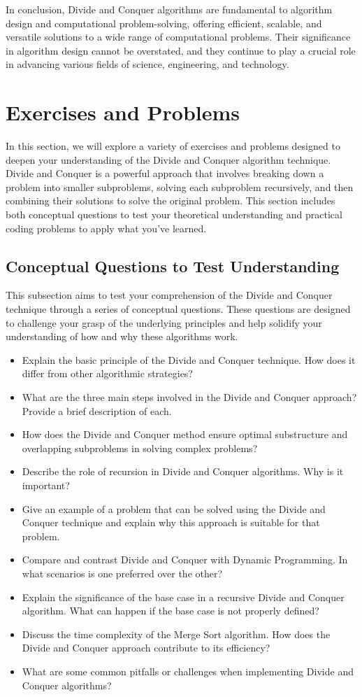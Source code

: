 \documentclass[12pt]{book} %
\begin{document}
In conclusion, Divide and Conquer algorithms are fundamental to algorithm design and computational problem-solving, offering efficient, scalable, and versatile solutions to a wide range of computational problems. Their significance in algorithm design cannot be overstated, and they continue to play a crucial role in advancing various fields of science, engineering, and technology.


\section{Exercises and Problems}
In this section, we will explore a variety of exercises and problems designed to deepen your understanding of the Divide and Conquer algorithm technique. Divide and Conquer is a powerful approach that involves breaking down a problem into smaller subproblems, solving each subproblem recursively, and then combining their solutions to solve the original problem. This section includes both conceptual questions to test your theoretical understanding and practical coding problems to apply what you've learned.

\subsection{Conceptual Questions to Test Understanding}
This subsection aims to test your comprehension of the Divide and Conquer technique through a series of conceptual questions. These questions are designed to challenge your grasp of the underlying principles and help solidify your understanding of how and why these algorithms work.

\begin{itemize}
    \item Explain the basic principle of the Divide and Conquer technique. How does it differ from other algorithmic strategies?
    \item What are the three main steps involved in the Divide and Conquer approach? Provide a brief description of each.
    \item How does the Divide and Conquer method ensure optimal substructure and overlapping subproblems in solving complex problems?
    \item Describe the role of recursion in Divide and Conquer algorithms. Why is it important?
    \item Give an example of a problem that can be solved using the Divide and Conquer technique and explain why this approach is suitable for that problem.
    \item Compare and contrast Divide and Conquer with Dynamic Programming. In what scenarios is one preferred over the other?
    \item Explain the significance of the base case in a recursive Divide and Conquer algorithm. What can happen if the base case is not properly defined?
    \item Discuss the time complexity of the Merge Sort algorithm. How does the Divide and Conquer approach contribute to its efficiency?
    \item What are some common pitfalls or challenges when implementing Divide and Conquer algorithms?
\end{itemize}
\end{document}
